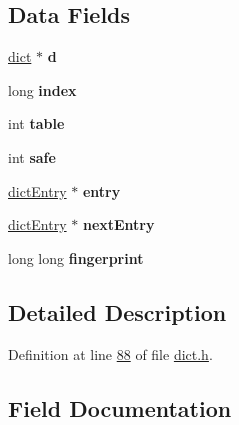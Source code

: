 \subsection*{Data Fields}
\begin{DoxyCompactItemize}
\item 
\mbox{\label{structdictIterator_a1d2b99eef5ff04edcd4ac1d2e44cee03}} 
\hyperlink{structdict}{dict} $\ast$ {\bfseries d}
\item 
\mbox{\label{structdictIterator_a3e0798e8d5e0906fbd6181a2588b3e98}} 
long {\bfseries index}
\item 
\mbox{\label{structdictIterator_aea5d0c657d1dbea4bde6e7915c305598}} 
int {\bfseries table}
\item 
\mbox{\label{structdictIterator_af8dd20e8e8bdab1e0331015005aba390}} 
int {\bfseries safe}
\item 
\mbox{\label{structdictIterator_a5bbcc9b0c792e1ee68c6a4ed049da816}} 
\hyperlink{structdictEntry}{dict\+Entry} $\ast$ {\bfseries entry}
\item 
\mbox{\label{structdictIterator_aa030de14f2996420066a50980581d0d8}} 
\hyperlink{structdictEntry}{dict\+Entry} $\ast$ {\bfseries next\+Entry}
\item 
\mbox{\label{structdictIterator_a88066bf1d96483011eaf2cf73ee4f0a0}} 
long long {\bfseries fingerprint}
\end{DoxyCompactItemize}


\subsection{Detailed Description}


Definition at line \hyperlink{dict_8h_source_l00088}{88} of file \hyperlink{dict_8h_source}{dict.\+h}.



\subsection{Field Documentation}
\mbox{\label{structdictIterator_a1d2b99eef5ff04edcd4ac1d2e44cee03}} 
